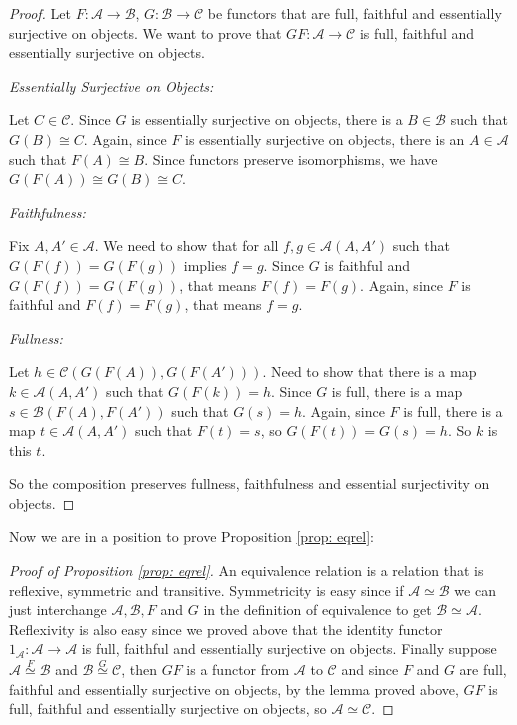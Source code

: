 \documentclass[11pt]{article}
\theoremstyle{definition}
\theoremstyle{plain}
\theoremstyle{plain}
\theoremstyle{plain}
\begin{document}
\begin{proof}
Let $F:\mathscr{A}\to\mathscr{B}$, $G:\mathscr{B}\to\mathscr{C}$ be functors that are full, faithful and essentially surjective on objects. We want to prove that $GF:\mathscr{A}\to\mathscr{C}$ is full, faithful and essentially surjective on objects.

\emph{Essentially Surjective on Objects:}

Let $C\in\mathscr{C}$. Since $G$ is essentially surjective on objects, there is a $B\in\mathscr{B}$ such that $G(B) \cong C$. Again, since $F$ is essentially surjective on objects, there is an $A\in\mathscr{A}$ such that $F(A) \cong B$. Since functors preserve isomorphisms, we have $G(F(A)) \cong G(B) \cong C$.

\emph{Faithfulness:}

Fix $A,A'\in\mathscr{A}$. We need to show that for all $f,g \in \mathscr{A}(A,A')$ such that $G(F(f))=G(F(g))$ implies $f=g$. Since $G$ is faithful and $G(F(f))=G(F(g))$, that means $F(f)=F(g)$. Again, since $F$ is faithful and $F(f)=F(g)$, that means $f=g$.

\emph{Fullness:}

Let $h \in \mathscr{C}(G(F(A)), G(F(A')))$. Need to show that there is a map $k \in \mathscr{A}(A,A')$ such that $G(F(k)) = h$. Since $G$ is full, there is a map $s \in \mathscr{B}(F(A), F(A'))$ such that $G(s)=h$. Again, since $F$ is full, there is a map $t \in \mathscr{A}(A, A')$ such that $F(t)=s$, so $G(F(t))=G(s)=h$. So $k$ is this $t$.

So the composition preserves fullness, faithfulness and essential surjectivity on objects.
\end{proof}

Now we are in a position to prove Proposition \ref{prop: eqrel}:

\begin{proof}[Proof of Proposition \ref{prop: eqrel}]
An equivalence relation is a relation that is reflexive, symmetric and transitive. Symmetricity is easy since if $\mathscr{A}\simeq\mathscr{B}$ we can just interchange $\mathscr{A},\mathscr{B},F$ and $G$ in the definition of equivalence to get $\mathscr{B}\simeq\mathscr{A}$. Reflexivity is also easy since we proved above that the identity functor $1_{\mathscr{A}}:\mathscr{A}\to\mathscr{A}$ is full, faithful and essentially surjective on objects. Finally suppose $\mathscr{A}\overset{F}{\simeq}\mathscr{B}$ and $\mathscr{B}\overset{G}{\simeq}\mathscr{C}$, then $GF$ is a functor from $\mathscr{A}$ to $\mathscr{C}$ and since $F$ and $G$ are full, faithful and essentially surjective on objects, by the lemma proved above, $GF$ is full, faithful and essentially surjective on objects, so $\mathscr{A}\simeq\mathscr{C}$.
\end{proof}
\end{document}

